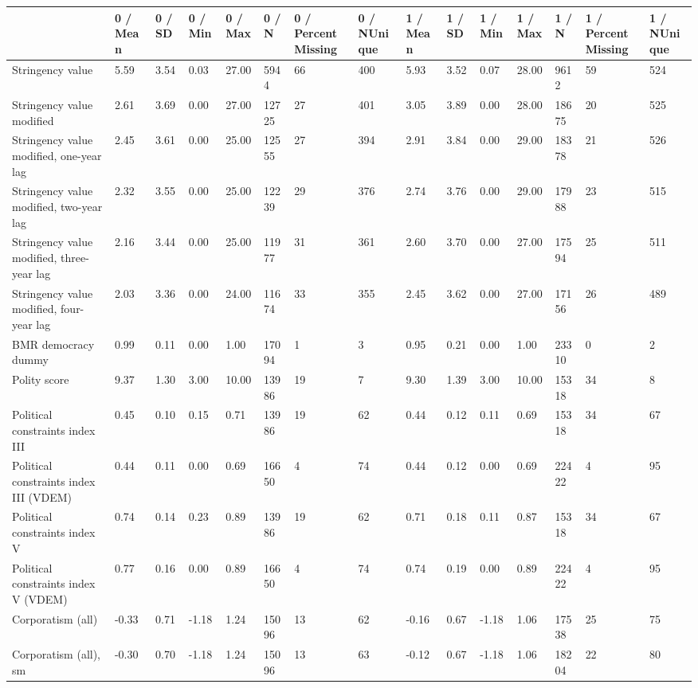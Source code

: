
\begin{longtable}{lllllllllllllll}
\toprule
  & 0 / Mean & 0 / SD & 0 / Min & 0 / Max & 0 / N & 0 / PercentMissing & 0 / NUnique & 1 / Mean & 1 / SD & 1 / Min & 1 / Max & 1 / N & 1 / PercentMissing & 1 / NUnique\\
\midrule
Stringency value & 5.59 & 3.54 & 0.03 & 27.00 & 5944 & 66 & 400 & 5.93 & 3.52 & 0.07 & 28.00 & 9612 & 59 & 524\\
Stringency value modified & 2.61 & 3.69 & 0.00 & 27.00 & 12725 & 27 & 401 & 3.05 & 3.89 & 0.00 & 28.00 & 18675 & 20 & 525\\
Stringency value modified, one-year lag & 2.45 & 3.61 & 0.00 & 25.00 & 12555 & 27 & 394 & 2.91 & 3.84 & 0.00 & 29.00 & 18378 & 21 & 526\\
Stringency value modified, two-year lag & 2.32 & 3.55 & 0.00 & 25.00 & 12239 & 29 & 376 & 2.74 & 3.76 & 0.00 & 29.00 & 17988 & 23 & 515\\
Stringency value modified, three-year lag & 2.16 & 3.44 & 0.00 & 25.00 & 11977 & 31 & 361 & 2.60 & 3.70 & 0.00 & 27.00 & 17594 & 25 & 511\\
\addlinespace
Stringency value modified, four-year lag & 2.03 & 3.36 & 0.00 & 24.00 & 11674 & 33 & 355 & 2.45 & 3.62 & 0.00 & 27.00 & 17156 & 26 & 489\\
BMR democracy dummy & 0.99 & 0.11 & 0.00 & 1.00 & 17094 & 1 & 3 & 0.95 & 0.21 & 0.00 & 1.00 & 23310 & 0 & 2\\
Polity score & 9.37 & 1.30 & 3.00 & 10.00 & 13986 & 19 & 7 & 9.30 & 1.39 & 3.00 & 10.00 & 15318 & 34 & 8\\
Political constraints index III & 0.45 & 0.10 & 0.15 & 0.71 & 13986 & 19 & 62 & 0.44 & 0.12 & 0.11 & 0.69 & 15318 & 34 & 67\\
Political constraints index III (VDEM) & 0.44 & 0.11 & 0.00 & 0.69 & 16650 & 4 & 74 & 0.44 & 0.12 & 0.00 & 0.69 & 22422 & 4 & 95\\
\addlinespace
Political constraints index V & 0.74 & 0.14 & 0.23 & 0.89 & 13986 & 19 & 62 & 0.71 & 0.18 & 0.11 & 0.87 & 15318 & 34 & 67\\
Political constraints index V (VDEM) & 0.77 & 0.16 & 0.00 & 0.89 & 16650 & 4 & 74 & 0.74 & 0.19 & 0.00 & 0.89 & 22422 & 4 & 95\\
Corporatism (all) & -0.33 & 0.71 & -1.18 & 1.24 & 15096 & 13 & 62 & -0.16 & 0.67 & -1.18 & 1.06 & 17538 & 25 & 75\\
Corporatism (all), sm & -0.30 & 0.70 & -1.18 & 1.24 & 15096 & 13 & 63 & -0.12 & 0.67 & -1.18 & 1.06 & 18204 & 22 & 80\\

\end{longtable}
